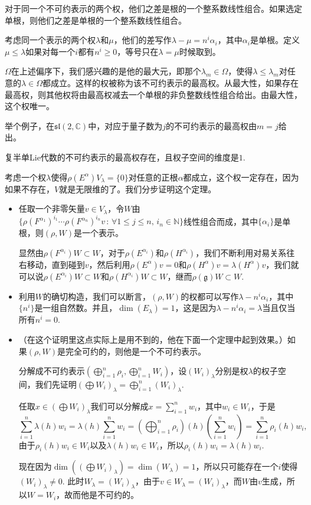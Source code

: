 \documentclass[9pt]{extarticle}
\newcommand{\cc}{\mathbb{C}}
\newcommand{\lag}{{\mathfrak{g}}}
\begin{document}
\pro 对于同一个不可约表示的两个权，他们之差是根的一个整系数线性组合。如果选定单根，则他们之差是单根的一个整系数线性组合。

\para 考虑同一个表示的两个权$\lambda$和$\mu$，他们的差写作$\lambda-\mu=n^i \alpha_i$，其中$\alpha_i$是单根。定义$\mu \leq \lambda$如果对每一个$i$都有$n^i\geq 0$，等号只在$\lambda=\mu$时候取到。

$\Omega$在上述偏序下，我们感兴趣的是他的最大元，即那个$\lambda_m\in \Omega$，使得$\lambda\leq \lambda_m$对任意的$\lambda\in \Omega$都成立。这样的权被称为该不可约表示的最高权。从最大性，如果存在最高权，则其他权将由最高权减去一个单根的非负整数线性组合给出。由最大性，这个权唯一。

举个例子，在$\mathfrak{sl}(2,\cc)$中，对应于量子数为$j$的不可约表示的最高权由$m=j$给出。

\theo 复半单Lie代数的不可约表示的最高权存在，且权子空间的维度是$1$.

\proof 考虑一个权$\lambda$使得$\rho(E^\alpha)V_\lambda=\{0\}$对任意的正根$\alpha$都成立，这个权一定存在，因为如果不存在，$V$就是无限维的了。我们分步证明这个定理。

\begin{itemize}
\item 任取一个非零矢量$v\in V_\lambda$，令$W$由$\bigl\{\rho(F^{\alpha_1})^{i_1}\cdots \rho(F^{\alpha_n})^{i_n}v\,:\, \forall 1\leq j\leq n,\, i_n\in \mathbb{N}\bigr\}$线性组合而成，其中$\{\alpha_i\}$是单根，则$(\rho,W)$是一个表示。

显然由$\rho(F^{\alpha_i})W\subset W$，对于$\rho(E^{\alpha_i})$和$\rho(H^{\alpha_i})$，我们不断利用对易关系往右移动，直到碰到$v$，然后利用$\rho(E^\alpha)v=0$和$\rho(H^\alpha)v=\lambda(H^\alpha)v$，我们就可以说$\rho(E^{\alpha_i})W\subset W$和$\rho(H^{\alpha_i})W\subset W$，继而$\rho(\lag)W\subset W$.

\item 利用$W$的确切构造，我们可以断言，$(\rho,W)$的权都可以写作$\lambda-n^i\alpha_i$，其中$\{n^i\}$是一组自然数。并且，$\dim(E_\lambda)=1$，这是因为$\lambda-n^i\alpha_i=\lambda$当且仅当所有$n^i=0$.

\item （在这个证明里这点实际上是用不到的，他在下面一个定理中起到效果。）如果$(\rho,W)$是完全可约的，则他是一个不可约表示。

分解成不可约表示$(\bigoplus_{i=1}^n\rho_i,\bigoplus_{i=1}^n W_i)$，设$(W_i)_\lambda$分别是权$\lambda$的权子空间，我们先证明$(\bigoplus W_i)_\lambda=\bigoplus_{i=1}^n (W_i)_\lambda$.

任取$x\in (\bigoplus W_i)_\lambda$我们可以分解成$x=\sum_{i=1}^nw_i$，其中$w_i\in W_i$，于是
\[
	\sum_{i=1}^n\lambda(h)w_i=\lambda(h)\sum_{i=1}^nw_i=\left(\bigoplus_{i=1}^n\rho_i\right)(h)\left(\sum_{i=1}^nw_i\right)=\sum_{i=1}^n\rho_i(h)w_i,
\]
由于$\rho_i(h)w_i\in W_i$以及$\lambda(h)w_i\in W_i$，所以$\rho_i(h)w_i=\lambda(h)w_i$. 

现在因为$\dim((\bigoplus W_i)_\lambda)=\dim(W_\lambda)=1$，所以只可能存在一个$i$使得$(W_i)_\lambda\neq 0$. 此时$W_\lambda=(W_i)_\lambda$，由于$v\in W_\lambda=(W_i)_\lambda$，而$W$由$v$生成，所以$W=W_i$，故而他是不可约的。
\end{itemize}
\end{document}
